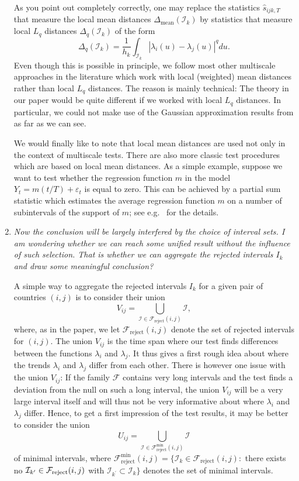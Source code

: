 \documentclass[a4paper,12pt]{article}
\begin{document}
\begin{enumerate}[label=(\arabic*),leftmargin=0.7cm]
As you point out completely correctly, one may replace the statistics $\hat{s}_{ijk,T}$ that measure the local mean distances $\Delta_{\text{mean}}(\mathcal{I}_k)$ by statistics that measure local $L_q$ distances $\Delta_q(\mathcal{I}_k)$ of the form 
\[ \Delta_q(\mathcal{I}_k) = \frac{1}{h_k} \int_{\mathcal{I}_k} |\lambda_i(u) - \lambda_j(u)|^q du. \]
Even though this is possible in principle, we follow most other multiscale approaches in the literature which work with local (weighted) mean distances rather than local $L_q$ distances. The reason is mainly technical: The theory in our paper would be quite different if we worked with local $L_q$ distances. In particular, we could not make use of the Gaussian approximation results from \cite{Chernozhukov2017} as far as we can see. 

We would finally like to note that local mean distances are used not only in the context of multiscale tests. There are also more classic test procedures which are based on local mean distances. As a simple example, suppose we want to test whether the regression function $m$ in the model $Y_t = m(t/T) + \varepsilon_t$ is equal to zero. This can be achieved by a partial sum statistic which estimates the average regression function $m$ on a number of subintervals of the support of $m$; see e.g.\ \cite{Stute1997} for the details. 


\item \textit{Now the conclusion will be largely interfered by the choice of interval sets. I am wondering whether we can reach some unified result without the influence of such selection. That is whether we can aggregate the rejected intervals $I_k$ and draw some meaningful conclusion?}

A simple way to aggregate the rejected intervals $I_k$ for a given pair of countries $(i,j)$ is to consider their union
\[ V_{ij} = \bigcup_{\mathcal{I} \in \mathcal{F}_{\text{reject}}(i,j)} \mathcal{I}, \]
where, as in the paper, we let $\mathcal{F}_{\text{reject}}(i,j)$ denote the set of rejected intervals for $(i,j)$. The union $V_{ij}$ is the time span where our test finds differences between the functions $\lambda_i$ and $\lambda_j$. It thus gives a first rough idea about where the trends $\lambda_i$ and $\lambda_j$ differ from each other. There is however one issue with the union $V_{ij}$: If the family $\mathcal{F}$ contains very long intervals and the test finds a deviation from the null on such a long interval, the union $V_{ij}$ will be a very large interval itself and will thus not be very informative about where $\lambda_i$ and $\lambda_j$ differ. Hence, to get a first impression of the test results, it may be better to consider the union 
\[ U_{ij} = \bigcup_{\mathcal{I} \in \mathcal{F}_{\text{reject}}^{\min}(i,j)} \mathcal{I} \]
of minimal intervals, where $\mathcal{F}_{\text{reject}}^{\text{min}}(i,j) = \{ \mathcal{I}_k \in \mathcal{F}_{\text{reject}}(i,j):$  there exists no $\mathcal{I}_{k^\prime} \in \mathcal{F}_{\text{reject}}(i,j)$ with $\mathcal{I}_{k^\prime} \subset \mathcal{I}_k \}$ denotes the set of minimal intervals. 


\end{enumerate}
\end{document}
